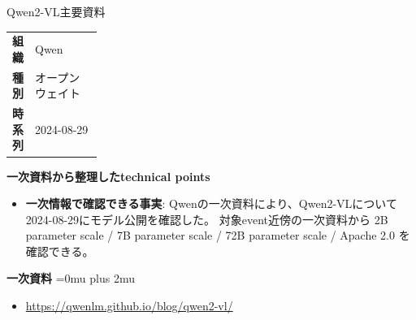 \begin{technicalnote}{Qwen2-VL}{主要資料}
\begingroup
\begin{tabularx}{\linewidth}{@{}>{\bfseries}p{0.22\linewidth}X@{}}
組織 & Qwen \\
種別 & オープンウェイト \\
時系列 & 2024-08-29 \\
\end{tabularx}
\smallskip
{\bfseries 一次資料から整理したtechnical points}
\begin{itemize}[leftmargin=1.5em,itemsep=0.35em]
\item \textbf{一次情報で確認できる事実}: Qwenの一次資料により、Qwen2-VLについて2024-08-29にモデル公開を確認した。 対象event近傍の一次資料から 2B parameter scale / 7B parameter scale / 72B parameter scale / Apache 2.0 を確認できる。
\end{itemize}
\begin{minipage}{\linewidth}
\begin{samepage}
{\bfseries 一次資料}
\begingroup\sloppy
\Urlmuskip=0mu plus 2mu\relax
\begin{itemize}[leftmargin=1.5em,itemsep=0.25em]
\item {\scriptsize\url{https://qwenlm.github.io/blog/qwen2-vl/}}
\end{itemize}
\endgroup
\end{samepage}
\end{minipage}
\endgroup
\end{technicalnote}
\medskip


